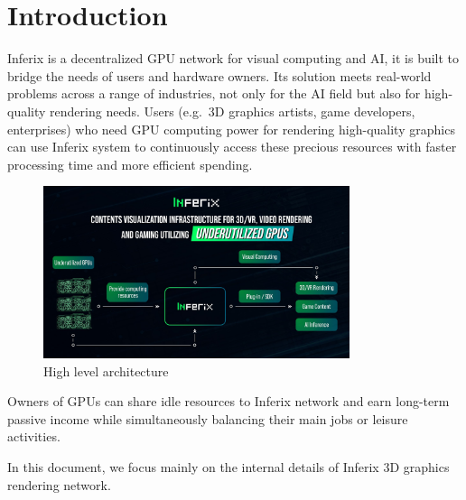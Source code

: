 \chapter{Introduction}
\label{ch:introduction}
Inferix is a decentralized GPU network for visual computing and AI, it is built to bridge the needs of users and hardware owners. Its solution meets real-world problems across a range of industries, not only for the AI field but also for high-quality rendering needs. Users (e.g.~3D graphics artists, game developers, enterprises) who need GPU computing power for rendering high-quality graphics can use Inferix system to continuously access these precious resources with faster processing time and more efficient spending.
\begin{figure}[h]
    \centering
    \includegraphics[width=0.8\textwidth]{inferix_high_level_architecture.jpg}
    \caption{High level architecture}
    \label{fig:inferix_rendering_network_high_level}
\end{figure}
Owners of GPUs can share idle resources to Inferix network and earn long-term passive income while simultaneously balancing their main jobs or leisure activities.

In this document, we focus mainly on the internal details of Inferix 3D graphics rendering network.




